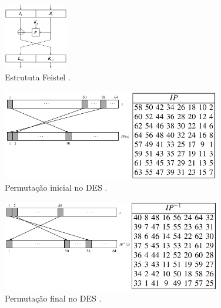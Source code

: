 \begin{frame}[allowframebreaks]
 \framebreak

\begin{figure}[h]
\centering
\includegraphics[width=0.25\textwidth,height=0.75\textheight,keepaspectratio]{figures/feistel.png}
\caption{Estrututa Feistel \cite{paar2014}.}
\label{fig-feistel}
\end{figure}

 \framebreak

\begin{figure}[h]
\centering
\includegraphics[width=0.85\textwidth,height=0.65\textheight,keepaspectratio]{figures/DES-initialpermutation.png}
\caption{Permutação inicial no DES \cite{paar2014}.}
\label{fig-DES-initialpermutation}
\end{figure}

 \framebreak

\begin{figure}[h]
\centering
\includegraphics[width=0.85\textwidth,height=0.65\textheight,keepaspectratio]{figures/DES-finalpermutation.png}
\caption{Permutação final no DES \cite{paar2014}.}
\label{fig-DES-finalpermutation}
\end{figure}

 \framebreak


\end{frame}
